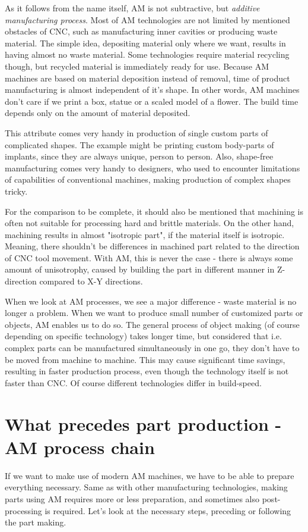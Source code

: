 \documentclass[a4paper, twoside, 11pt]{report}
\begin{document}
	As it follows from the name itself, AM is not subtractive, but \textit{additive manufacturing process}. Most of AM technologies are not limited by mentioned obstacles of CNC, such as manufacturing inner cavities or producing waste material. The simple idea, depositing material only where we want, results in having almost no waste material. Some technologies require material recycling though, but recycled material is immediately ready for use. Because AM machines are based on material deposition instead of removal, time of product manufacturing is almost independent of it's shape. In other words, AM machines don't care if we print a box, statue or a scaled model of a flower. The build time depends only on the amount of material deposited.

	This attribute comes very handy in production of single custom parts of complicated shapes. The example might be printing custom body-parts of implants, since they are always unique, person to person. Also, shape-free manufacturing comes very handy to designers, who used to encounter limitations of capabilities of conventional machines, making production of complex shapes tricky.
	
	For the comparison to be complete, it should also be mentioned that machining is often not suitable for processing hard and brittle materials. On the other hand, machining results in almost "isotropic part", if the material itself is isotropic. Meaning, there shouldn't be differences in machined part related to the direction of CNC tool movement. With AM, this is never the case - there is always some amount of unisotrophy, caused by building the part in different manner in Z-direction compared to X-Y directions.
	
	When we look at AM processes, we see a major difference - waste material is no longer a problem. When we want to produce small number of customized parts or objects, AM enables us to do so. The general process of object making (of course depending on specific technology) takes longer time, but considered that i.e. complex parts can be manufactured simultaneously in one go, they don't have to be moved from machine to machine. This may cause significant time savings, resulting in faster production process, even though the technology itself is not faster than CNC. Of course different technologies differ in build-speed.


\section{What precedes part production - AM process chain}
If we want to make use of modern AM machines, we have to be able to prepare everything necessary. Same as with other manufacturing  technologies, making parts using AM requires more or less preparation, and sometimes also post-processing is required. Let's look at the necessary steps, preceding or following the part making.\\
\end{document}

